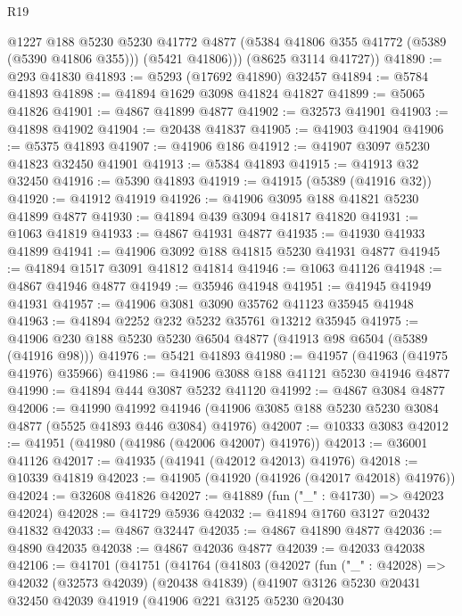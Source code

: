 \begin{lexlean}{R19}
\begin{coremodule}
          @1227
          @188
          @5230
          @5230
          @41772
          @4877
          (@5384 @41806 @355 @41772 (@5389 (@5390 @41806 @355)))
          (@5421 @41806)))
      (@8625 @3114 @41727))
@41890 := @293 @41830
@41893 := @5293 (@17692 @41890) @32457
@41894 := @5784 @41893
@41898 := @41894 @1629 @3098 @41824 @41827
@41899 := @5065 @41826
@41901 := @4867 @41899 @4877
@41902 := @32573 @41901
@41903 := @41898 @41902
@41904 := @20438 @41837
@41905 := @41903 @41904
@41906 := @5375 @41893
@41907 := @41906 @186
@41912 := @41907 @3097 @5230 @41823 @32450 @41901
@41913 := @5384 @41893
@41915 := @41913 @32 @32450
@41916 := @5390 @41893
@41919 := @41915 (@5389 (@41916 @32))
@41920 := @41912 @41919
@41926 := @41906 @3095 @188 @41821 @5230 @41899 @4877
@41930 := @41894 @439 @3094 @41817 @41820
@41931 := @1063 @41819
@41933 := @4867 @41931 @4877
@41935 := @41930 @41933 @41899
@41941 := @41906 @3092 @188 @41815 @5230 @41931 @4877
@41945 := @41894 @1517 @3091 @41812 @41814
@41946 := @1063 @41126
@41948 := @4867 @41946 @4877
@41949 := @35946 @41948
@41951 := @41945 @41949 @41931
@41957 := @41906 @3081 @3090 @35762 @41123 @35945 @41948
@41963 := @41894 @2252 @232 @5232 @35761 @13212 @35945
@41975 := @41906 @230 @188 @5230 @5230 @6504 @4877 (@41913 @98 @6504 (@5389 (@41916 @98)))
@41976 := @5421 @41893
@41980 := @41957 (@41963 (@41975 @41976) @35966)
@41986 := @41906 @3088 @188 @41121 @5230 @41946 @4877
@41990 := @41894 @444 @3087 @5232 @41120
@41992 := @4867 @3084 @4877
@42006 := @41990
    @41992
    @41946
    (@41906 @3085 @188 @5230 @5230 @3084 @4877 (@5525 @41893 @446 @3084) @41976)
@42007 := @10333 @3083
@42012 := @41951 (@41980 (@41986 (@42006 @42007) @41976))
@42013 := @36001 @41126
@42017 := @41935 (@41941 (@42012 @42013) @41976)
@42018 := @10339 @41819
@42023 := @41905 (@41920 (@41926 (@42017 @42018) @41976))
@42024 := @32608 @41826
@42027 := @41889 (fun ("_" : @41730) => @42023 @42024)
@42028 := @41729 @5936
@42032 := @41894 @1760 @3127 @20432 @41832
@42033 := @4867 @32447
@42035 := @4867 @41890 @4877
@42036 := @4890 @42035
@42038 := @4867 @42036 @4877
@42039 := @42033 @42038
@42106 := @41701
    (@41751
      (@41764
        (@41803
          (@42027
            (fun ("_" : @42028) =>
            @42032
              (@32573 @42039)
              (@20438 @41839)
              (@41907
                @3126
                @5230
                @20431
                @32450
                @42039
                @41919
                (@41906
                  @221
                  @3125
                  @5230
                  @20430

\end{coremodule}
\end{lexlean}
